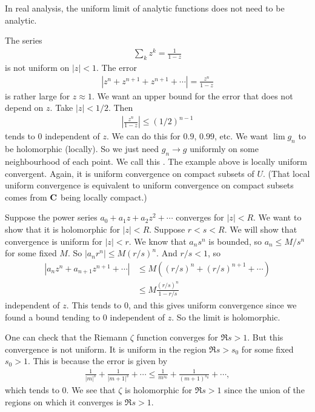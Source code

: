 \documentclass[11pt, oneside,margin=1in]{article}
\begin{document}
\begin{warn}
	In real analysis, the uniform limit of analytic functions does not need to be analytic.
\end{warn}

\begin{problem}
	The series
	\begin{align*}
		\sum_{k}^{} z^k = \frac{1}{1-z}
	\end{align*}
	is not uniform on $\left\lvert z \right\rvert <1$. The error 
	\begin{align*}
		\left\lvert z^n + z^{n+1} + z^{n+1} + \cdots \right\rvert = \frac{z^n}{1-z}
	\end{align*}
	is rather large for $z\approx 1$. We want an upper bound for the error that does not depend on $z$. Take $\left\lvert z \right\rvert <1/2$. Then 
	\begin{align*}
		\left\lvert \frac{z^n}{1-z} \right\rvert \le (1/2)^{n-1}
	\end{align*}
	tends to $0$ independent of $z$. We can do this for $0.9$, $0.99$, etc. We want $\lim g_n$ to be holomorphic (locally). So we just need $g_n\to g$ uniformly on some neighbourhood of each point. We call this . The example above is locally uniform convergent. Again, it is uniform convergence on compact subsets of $U$. (That local uniform convergence is equivalent to uniform convergence on compact subsets comes from $\mathbf C$ being locally compact.) 
\end{problem}

Suppose the power series $a_0 + a_1z + a_2z^2 + \cdots$ converges for $\left\lvert z \right\rvert <R$. We want to show that it is holomorphic for $\left\lvert z \right\rvert < R$. Suppose $r<s<R$. We will show that convergence is uniform for $\left\lvert z \right\rvert < r$. We know that $a_ns^n$ is bounded, so $a_n \le M/s^n$ for some fixed $M$. So $\left\lvert a_nr^n \right\rvert \le M(r/s) ^n$. And $r/s<1$, so
\begin{align*}
	\left\lvert a_nz^n + a_{n+1}z^{n+1} + \cdots \right\rvert &\le M((r/s) ^n +(r/s)^{n+1} + \cdots ) \\
								  &\le M\frac{(r/s)^n}{1-r/s}
\end{align*}
 independent of $z$. This tends to $0$, and this gives uniform convergence since we found a bound tending to $0$ independent of $z$. So the limit is holomorphic.

One can check that the Riemann $\zeta$ function converges for $\Re s>1$. But this convergence is not uniform. It is uniform in the region $\Re s>s_0$ for some fixed $s_0>1$. This is because the error is given by
\begin{align*}
	\frac{1}{\left\lvert m \right\rvert ^s} + \frac{1}{\left\lvert m+1 \right\rvert ^s} + \cdots \le \frac{1}{m^{s_0}} + \frac{1}{(m+1)^{s_0}} + \cdots,
\end{align*}
which tends to $0$. We see that $\zeta$ is holomorphic for $\Re s>1$ since the union of the regions on which it converges is $\Re s > 1$.
\end{document}
